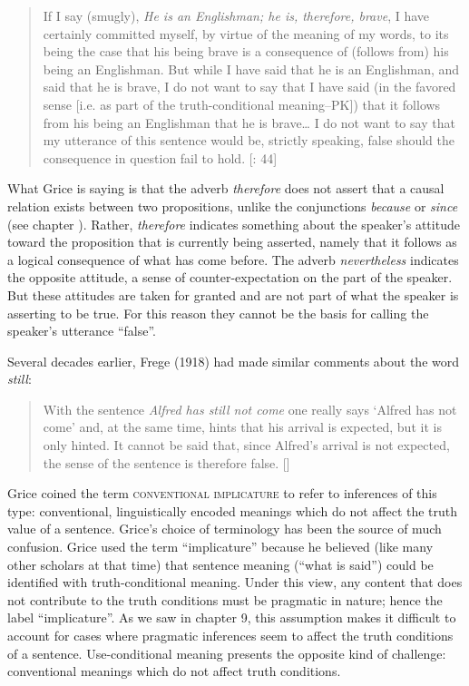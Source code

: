 \begin{quote}
If I say (smugly), \textit{He is an Englishman; he is, therefore, brave}, I have certainly committed myself, by virtue of the meaning of my words, to its being the case that his being brave is a consequence of (follows from) his being an Englishman. But while I have said that he is an Englishman, and said that he is brave, I do not want to say that I have said (in the favored sense [i.e. as part of the truth-conditional meaning–PK]) that it follows from his being an Englishman that he is brave…  I do not want to say that my utterance of this sentence would be, strictly speaking, false should the consequence in question fail to hold.  [\citealt{Grice1975}: 44]
\end{quote}


What Grice is saying is that the adverb \textit{therefore} does not assert that a causal relation exists between two propositions, unlike the conjunctions \textit{because} or \textit{since} (see chapter ). Rather, \textit{therefore} indicates something about the speaker’s attitude toward the proposition that is currently being asserted, namely that it follows as a logical consequence of what has come before. The adverb \textit{nevertheless} indicates the opposite attitude, a sense of counter-expectation on the part of the speaker. But these attitudes are taken for granted and are not part of what the speaker is asserting to be true. For this reason they cannot be the basis for calling the speaker’s utterance “false”.



Several decades earlier, Frege (1918) had made similar comments about the word \textit{still}:


\begin{quote}
With the sentence \textit{Alfred has still not come} one really says ‘Alfred has not come’ and, at the same time, hints that his arrival is expected, but it is only hinted. It cannot be said that, since Alfred’s arrival is not expected, the sense of the sentence is therefore false. [\citealt{Frege1918}]
\end{quote}



Grice coined the term \textsc{conventional implicature} to refer to inferences of this type: conventional, linguistically encoded meanings which do not affect the truth value of a sentence. Grice’s choice of terminology has been the source of much confusion. Grice used the term “implicature” because he believed (like many other scholars at that time) that sentence meaning (“what is said”) could be identified with truth-conditional meaning. Under this view, any content that does not contribute to the truth conditions must be pragmatic in nature; hence the label “implicature”. As we saw in chapter 9, this assumption makes it difficult to account for cases where pragmatic inferences seem to affect the truth conditions of a sentence. Use-conditional meaning presents the opposite kind of challenge: conventional meanings which do not affect truth conditions.




